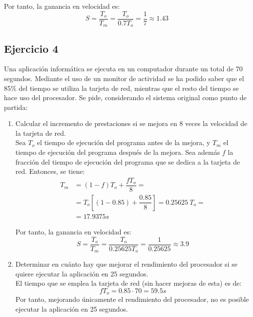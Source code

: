 Por tanto, la ganancia en velocidad es:
\begin{equation*}
    S = \dfrac{T_o}{T_m} = \dfrac{T_o}{0.7T_o} = \frac{1}{7} \approx 1.43
\end{equation*}

\subsection*{Ejercicio 4}

Una aplicación informática se ejecuta en un computador durante un total de 70 segundos. Mediante el uso de un monitor de actividad se ha podido saber que el 85\% del tiempo se utiliza la tarjeta de red, mientras que el resto del tiempo se hace uso del procesador. Se pide, considerando el sistema original como punto de partida:

\begin{enumerate}
    \item Calcular el incremento de prestaciones si se mejora en 8 veces la velocidad de la tarjeta de red.\\
    
    Sea $T_o$ el tiempo de ejecución del programa antes de la mejora, y $T_m$ el tiempo de ejecución del programa después de la mejora. Sea además $f$ la fracción del tiempo de ejecución del programa que se dedica a la tarjeta de red. Entonces, se tiene:
    \begin{align*}
        T_m &= (1-f)T_o + \dfrac{fT_o}{8}
        =\\&= T_o\left[(1-0.85) + \dfrac{0.85}{8}\right]
        = 0.25625\ T_o
        =\\&= 17.9375s
    \end{align*}

    Por tanto, la ganancia en velocidad es:
    \begin{equation*}
        S = \dfrac{T_o}{T_m} = \dfrac{T_o}{0.25625T_o} = \frac{1}{0.25625} \approx 3.9
    \end{equation*}
    \item Determinar en cuánto hay que mejorar el rendimiento del procesador si se quiere ejecutar la aplicación en 25 segundos.\\
    
    El tiempo que se emplea la tarjeta de red (sin hacer mejoras de esta) es de:
    \begin{equation*}
        fT_o = 0.85\cdot 70 = 59.5s
    \end{equation*}
    Por tanto, mejorando únicamente el rendimiento del procesador, no es posible ejecutar la aplicación en 25 segundos.
\end{enumerate}

